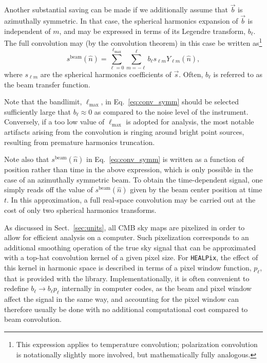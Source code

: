 \documentclass[onecolumn]{aa}
\newcommand{\s}[0]{\vec{s}}
\renewcommand{\b}[0]{\vec{b}}
\newcommand{\HEALPix}[0]{\texttt{HEALPix}}
\begin{document}
Another substantial saving can be made if we additionally assume that
$\b$ is azimuthally symmetric. In that case, the spherical harmonics
expansion of $\b$ is independent of $m$, and may be expressed in terms
of its Legendre transform, $b_{\ell}$. The full convolution may (by
the convolution theorem) in this case be written as\footnote{This expression
  applies to temperature convolution; polarization convolution is
  notationally slightly more involved, but mathematically fully
  analogous.}
\begin{equation}
s^{\mathrm{beam}}(\hat{n}) =
\sum_{\ell=0}^{\ell_{\mathrm{max}}}\sum_{m=-\ell}^{\ell} b_{\ell}
s_{\ell m} Y_{\ell m}(\hat{n}),
\label{eq:conv_symm}
\end{equation}
where $s_{\ell m}$ are the spherical harmonics coefficients of
$\s$. Often, $b_{\ell}$ is referred to as the beam transfer function.

Note that the bandlimit, $\ell_{\mathrm{max}}$, in
Eq.~\eqref{eq:conv_symm} should be selected sufficiently large that
$b_{\ell} \approx 0$ as compared to the noise level of the
instrument. Conversely, if a too low value of $\ell_{\mathrm{max}}$ is
adopted for analysis, the most notable artifacts arising from the
convolution is ringing around bright point sources, resulting from
premature harmonics truncation.

Note also that $s^{\mathrm{beam}}(\hat{n})$ in Eq.~\eqref{eq:conv_symm}
is written as a function
of position rather than time in the above expression, which is only
possible in the case of an azimuthally symmetric beam. To obtain the
time-dependent signal, one simply reads off the value of
$s^{\mathrm{beam}}(\hat{n})$ given by the beam center position at
time $t$. In this approximation, a full real-space convolution may be
carried out at the cost of only two spherical harmonics transforms. 

As discussed in Sect.~\ref{sec:units}, all CMB sky maps are pixelized
in order to allow for efficient analysis on a computer. Such pixelization
corresponds to an additional smoothing operation of the true sky
signal that can be approximated with a top-hat convolution kernel of a
given pixel size. For \HEALPix, the effect of this kernel in harmonic
space is described in terms of a pixel window function, $p_{\ell}$,
that is provided with the library. Implementationally, it is often
convenient to redefine $b_{\ell} \rightarrow b_{\ell}p_{\ell}$
internally in computer codes, as the beam and pixel window affect the
signal in the same way, and accounting for the pixel window can
therefore usually be done with no additional computational cost
compared to beam convolution.
\end{document}
